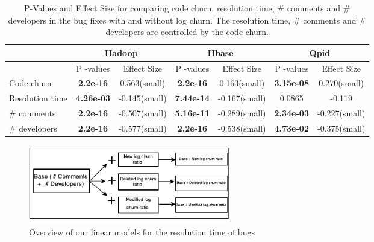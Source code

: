 \documentclass[conference]{IEEEtran}
\begin{document}
\begin{table}
\caption{P-Values and Effect Size for comparing code churn, resolution time, \# comments and \# developers in the bug fixes with and without log churn. The resolution time, \# comments and \# developers are controlled by the code churn.}
\label{tab:bugfixes}
\centering{}%
\begin{tabular}{|>{\centering}m{4.1cm}|c|c|c|c|c|c|}
\hline 
\multirow{2}{*}{Metrics}& \multicolumn{2}{c|}{Hadoop} & \multicolumn{2}{c|}{Hbase} & \multicolumn{2}{c|}{Qpid}\tabularnewline
\cline{2-7} 

 & P -values  & Effect Size & P -values  & Effect Size & P -values  & Effect Size\tabularnewline
\hline 
Code churn & \textbf{2.2e-16} & 0.563(small) & \textbf{2.2e-16} & 0.163(small) & \textbf{3.15e-08} & 0.270(small)\tabularnewline
\hline 
Resolution time & \textbf{4.26e-03} & -0.145(small) & \textbf{7.44e-14} & -0.167(small) & 0.0865 & -0.119\tabularnewline
\hline 
\# comments & \textbf{2.2e-16} & -0.507(small) & \textbf{5.16e-11} & -0.289(small) & \textbf{2.34e-03} & -0.227(small)\tabularnewline
\hline 
\# developers & \textbf{2.2e-16} & -0.577(small) & \textbf{2.2e-16} & -0.538(small) & \textbf{4.73e-02} & -0.375(small)\tabularnewline
\hline 
\end{tabular}
\end{table}



\begin{figure}
	\centering
	\includegraphics[width=8.8cm]{model}
	\caption{ Overview of our linear models for the resolution time of bugs }
	\label{fig:models}
\end{figure}
\end{document}
